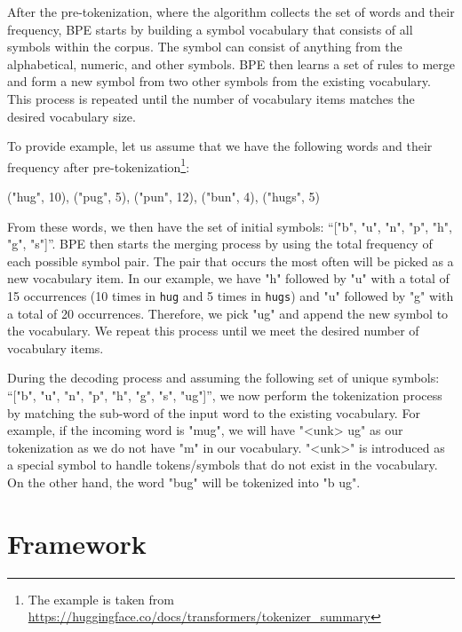 After the pre-tokenization, where the algorithm collects the set of words and their frequency, BPE starts by building a symbol vocabulary that consists of all symbols within the corpus. The symbol can consist of anything from the alphabetical, numeric, and other symbols. BPE then learns a set of rules to merge and form a new symbol from two other symbols from the existing vocabulary. This process is repeated until the number of vocabulary items matches the desired vocabulary size.

To provide example, let us assume that we have the following words and their frequency after pre-tokenization\footnote{The example is taken from \url{https://huggingface.co/docs/transformers/tokenizer_summary}}:

\bigskip
("hug", 10), ("pug", 5), ("pun", 12), ("bun", 4), ("hugs", 5)
\bigskip

From these words, we then have the set of initial symbols: ``["b", "u", "n", "p", "h", "g", "s"]''. BPE then starts the merging process by using the total frequency of each possible symbol pair. The pair that occurs the most often will be picked as a new vocabulary item. In our example, we have "h" followed by "u" with a total of 15 occurrences (10 times in \texttt{hug} and 5 times in \texttt{hugs}) and "u" followed by "g" with a total of 20 occurrences. Therefore, we pick "ug" and append the new symbol to the vocabulary. We repeat this process until we meet the desired number of vocabulary items.

During the decoding process and assuming the following set of unique symbols: ``["b", "u", "n", "p", "h", "g", "s", "ug"]'', we now perform the tokenization process by matching the sub-word of the input word to the existing vocabulary. For example, if the incoming word is "mug", we will have "<unk> ug" as our tokenization as we do not have "m" in our vocabulary. "<unk>" is introduced as a special symbol to handle tokens/symbols that do not exist in the vocabulary. On the other hand, the word "bug" will be tokenized into "b ug".

\section{Framework}
\label{sec:framework}

